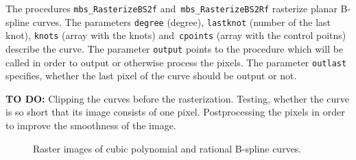 \vspace{\bigskipamount}
The procedures \texttt{mbs\_RasterizeBS2f} and~\texttt{mbs\_RasterizeBS2Rf}
rasterize planar B-spline curves. The parameters
\texttt{degree} (degree), \texttt{lastknot} (number of the last knot),
\texttt{knots} (array with the knots) and~\texttt{cpoints} (array with the
control poitns) describe the curve.
The parameter \texttt{output} points to the procedure which will be called
in order to output or otherwise process the pixels. The parameter
\texttt{outlast} specifies, whether the last pixel of the curve should be
output or not.

\vspace{\medskipamount}
\noindent
\textbf{TO DO:} Clipping the curves before the rasterization. Testing,
whether the curve is so short that its image consists of one pixel.
Postprocessing the pixels in order to improve the smoothness of the image.


\begin{figure}[ht]
  \centerline{}
  \caption{Raster images of cubic polynomial and rational B-spline curves.}
\end{figure}

\clearpage

